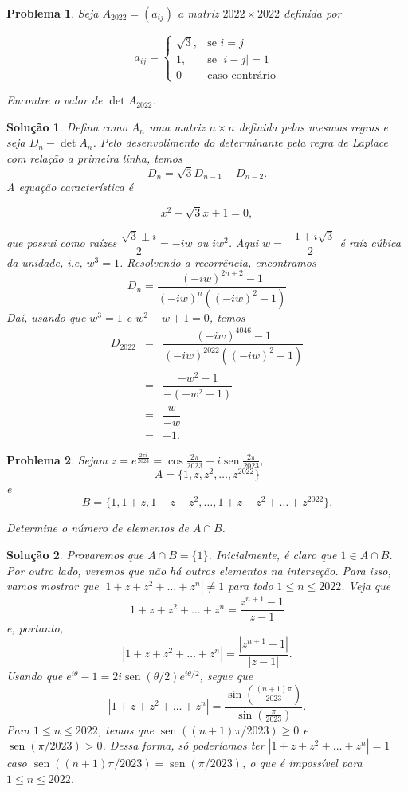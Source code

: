 \documentclass{hipatia}
\DeclareMathOperator{\sen}{sen}
\newtheorem{problem*}{Problema}
\newtheorem*{solution*}{Solução}
\begin{document}
\begin{problem*}
Seja $A_{2022} = (a_{ij})$ a matriz $2022 \times 2022$ definida por 

$$a_{ij} = \left \{ \begin{array}{cl} \sqrt{3}, & \text{se}\,\,i=j \\1, & \text{se}\,\,|i-j|=1 \\ 0 & \text{caso contrário} \end{array} \right .$$

\noindent Encontre o valor de  $\det A_{2022}$.

\end{problem*}

\begin{solution*}
Defina como $A_n$ uma matriz $n \times n $ definida pelas mesmas regras e seja $D_n - \det A_n$. Pelo desenvolimento do determinante pela regra de Laplace com relação a primeira linha, temos 
$$ D_n = \sqrt{3}D_{n-1}-D_{n-2}.$$
A equação característica é 

$$x^2-\sqrt{3}x+1=0,$$

\noindent que possui como raízes $\dfrac{\sqrt{3}\pm i}{2} = -iw$ ou $iw^2$. Aqui $w=\dfrac{-1+i\sqrt{3}}{2}$ é raíz cúbica da unidade, i.e, $w^3=1$. Resolvendo a recorrência, encontramos
$$D_n = \dfrac{(-iw)^{2n+2}-1}{(-iw)^n((-iw)^2-1)}$$
Daí, usando que $w^3=1$ e $w^2+w+1=0$, temos 
\begin{eqnarray*}
D_{2022} & = & \dfrac{(-iw)^{4046}-1}{(-iw)^{2022}((-iw)^2-1)} \\
         & = & \dfrac{-w^2-1}{-(-w^2-1)} \\
         & = & \dfrac{w}{-w} \\
         & = & -1.
\end{eqnarray*}
\end{solution*}


\begin{problem*}
Sejam $z = e^{\frac{2\pi i}{2023}} = \cos \frac{2\pi}{2023} + i\sen \frac{2\pi}{2023} $,
$$A = \{1, z, z^2, \ldots, z^{2022} \}$$
e
$$B = \{1, 1+z, 1+z+z^2, \ldots, 1+z+z^2+ \ldots+ z^{2022} \}.$$

\noindent Determine o número de elementos de $A \cap B$.
\end{problem*}

\begin{solution*}
Provaremos que $A \cap B = \{1\}$. Inicialmente, é claro que $1 \in A \cap B$. Por outro lado, veremos que não há outros elementos na interseção. Para isso, vamos mostrar que $|1 + z + z^2 + \ldots + z^n| \neq 1$ para todo $1 \le n \le 2022$. Veja que
\[
1 + z + z^2 + \ldots + z^n = \frac{z^{n+1}-1}{z-1}
\]
e, portanto,
\[
|1 + z + z^2 + \ldots + z^n| = \frac{|z^{n+1}-1|}{|z-1|}.
\]
Usando que $e^{i\theta}-1 = 2i \sen(\theta/2)e^{i\theta/2}$, segue que
\[
|1 + z + z^2 + \ldots + z^n| = \frac{\sin\left(\frac{(n+1)\pi}{2023}\right)}{\sin\left(\frac{\pi}{2023}\right)}.
\]
Para $1 \le n \le 2022$, temos que $\sen((n+1)\pi/2023) \ge 0$ e $\sen(\pi/2023) > 0$. Dessa forma, só poderíamos ter $|1 + z + z^2 + \ldots + z^n| = 1$ caso $\sen((n+1)\pi/2023) = \sen(\pi/2023)$, o que é impossível para $1 \le n \le 2022$.
\end{solution*}
\end{document}
